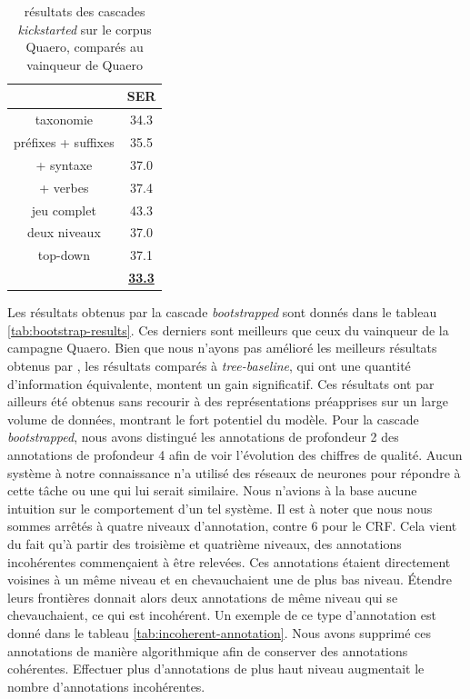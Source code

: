 \documentclass[12pt,a4paper,times,twoside,openright]{report}
\begin{document}
\begin{table}[ht!]
\centering
\begin{tabular}{|c|c|}
\cline{2-2}
\multicolumn{1}{c|}{} & SER \\
\hline
taxonomie             & 34.3        \\
\hline
préfixes + suffixes   & 35.5        \\
+ syntaxe             & 37.0        \\
+ verbes              & 37.4        \\
jeu complet           & 43.3        \\
\hline
deux niveaux          & 37.0        \\
top-down              & 37.1        \\
\hline
\hline
\citet{dinarelli2012} & \textbf{\underline{33.3}} \\
\hline
\end{tabular}
\caption{résultats des cascades \textit{kickstarted} sur le corpus Quaero, comparés au vainqueur de Quaero}
\label{tab:kickstart-results}
\end{table}

Les résultats obtenus par la cascade \textit{bootstrapped} sont donnés dans le tableau \ref{tab:bootstrap-results}. Ces derniers sont meilleurs que ceux du vainqueur de la campagne Quaero. Bien que nous n'ayons pas amélioré les meilleurs résultats obtenus par \citet{dinarelli2012}, les résultats comparés à \textit{tree-baseline}, qui ont une quantité d'information équivalente, montent un gain significatif. Ces résultats ont par ailleurs été obtenus sans recourir à des représentations préapprises sur un large volume de données, montrant le fort potentiel du modèle. Pour la cascade \textit{bootstrapped}, nous avons distingué les annotations de profondeur 2 des annotations de profondeur 4 afin de voir l'évolution des chiffres de qualité. Aucun système à notre connaissance n'a utilisé des réseaux de neurones pour répondre à cette tâche ou une qui lui serait similaire. Nous n'avions à la base aucune intuition sur le comportement d'un tel système. Il est à noter que nous nous sommes arrêtés à quatre niveaux d'annotation, contre 6 pour le CRF. Cela vient du fait qu'à partir des troisième et quatrième niveaux, des annotations incohérentes commençaient à être relevées. Ces annotations étaient directement voisines à un même niveau et en chevauchaient une de plus bas niveau. Étendre leurs frontières donnait alors deux annotations de même niveau qui se chevauchaient, ce qui est incohérent. Un exemple de ce type d'annotation est donné dans le tableau \ref{tab:incoherent-annotation}. Nous avons supprimé ces annotations de manière algorithmique afin de conserver des annotations cohérentes. Effectuer plus d'annotations de plus haut niveau augmentait le nombre d'annotations incohérentes.
\end{document}
